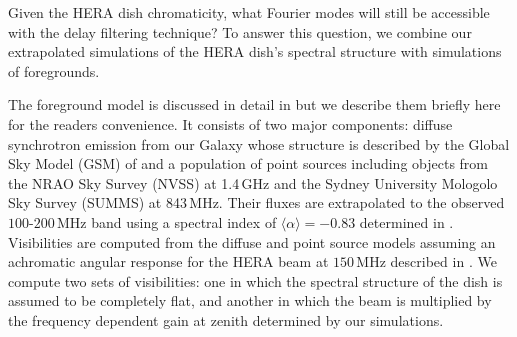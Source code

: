 \documentclass[twocolumn]{emulateapj}
\begin{document}
Given the HERA dish chromaticity, what Fourier modes will still be accessible with the delay filtering technique? To answer this question, we combine our extrapolated simulations of the HERA dish's spectral structure with simulations of foregrounds. 

The foreground model is discussed in detail in \citet{Thyagarajan:2016} but we describe them briefly here for the readers convenience. It consists of two major components: diffuse synchrotron emission from our Galaxy whose structure is described by the Global Sky Model (GSM) of \citet{deOliveiraCosta:2008} and a population of point sources including objects from the NRAO Sky Survey (NVSS) \citep{Condon:1998} at 1.4\,GHz and the Sydney University Mologolo Sky Survey (SUMMS) \citep{Bock:1999} at 843\,MHz. Their fluxes are extrapolated to the observed $100$-$200$\,MHz band using a spectral index of $\langle \alpha \rangle=-0.83$ determined in \citet{Mauch:2003}. Visibilities are computed from the diffuse and point source models assuming an achromatic angular response for the HERA beam at $150$\,MHz described in \citet{Neben:2016}. We compute two sets of visibilities: one in which the spectral structure of the dish is assumed to be completely flat, and another in which the beam is multiplied by the frequency dependent gain at zenith determined by our simulations.  
\end{document}
